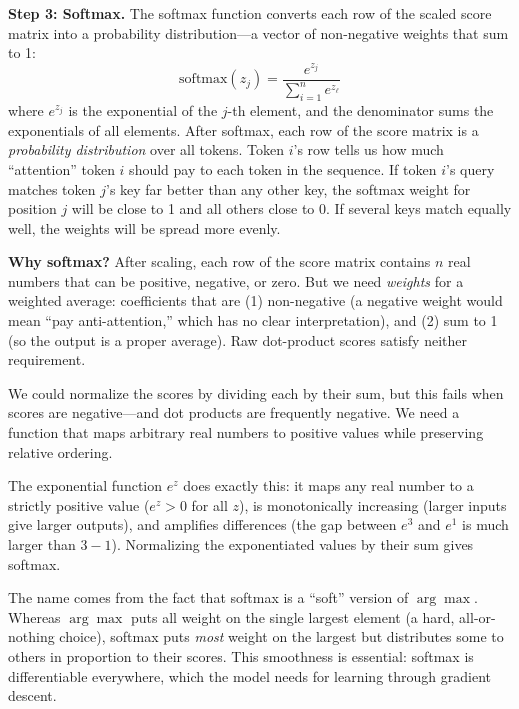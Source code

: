 %
\textbf{Step 3: Softmax.}\hspace{1em} The softmax function converts each row of the scaled score matrix into a probability distribution---a vector of non-negative weights that sum to 1:
\begin{equation}
\text{softmax}(z_j) = \frac{e^{z_j}}{\sum_{i=1}^{n} e^{z_\ell}}
\end{equation}
where $e^{z_j}$ is the exponential of the $j$-th element, and the denominator sums the exponentials of all elements. After softmax, each row of the score matrix is a \emph{probability distribution} over all tokens. Token $i$'s row tells us how much ``attention'' token $i$ should pay to each token in the sequence. If token $i$'s query matches token $j$'s key far better than any other key, the softmax weight for position $j$ will be close to 1 and all others close to 0. If several keys match equally well, the weights will be spread more evenly.

\begin{notebox}
\textbf{Why softmax?} After scaling, each row of the score matrix contains $n$ real numbers that can be positive, negative, or zero. But we need \emph{weights} for a weighted average: coefficients that are (1) non-negative (a negative weight would mean ``pay anti-attention,'' which has no clear interpretation), and (2) sum to 1 (so the output is a proper average). Raw dot-product scores satisfy neither requirement.

We could normalize the scores by dividing each by their sum, but this fails when scores are negative---and dot products are frequently negative. We need a function that maps arbitrary real numbers to positive values while preserving relative ordering.

The exponential function $e^z$ does exactly this: it maps any real number to a strictly positive value ($e^z > 0$ for all $z$), is monotonically increasing (larger inputs give larger outputs), and amplifies differences (the gap between $e^3$ and $e^1$ is much larger than $3 - 1$). Normalizing the exponentiated values by their sum gives softmax.

The name comes from the fact that softmax is a ``soft'' version of $\arg\max$. Whereas $\arg\max$ puts all weight on the single largest element (a hard, all-or-nothing choice), softmax puts \emph{most} weight on the largest but distributes some to others in proportion to their scores. This smoothness is essential: softmax is differentiable everywhere, which the model needs for learning through gradient descent.
\end{notebox}

